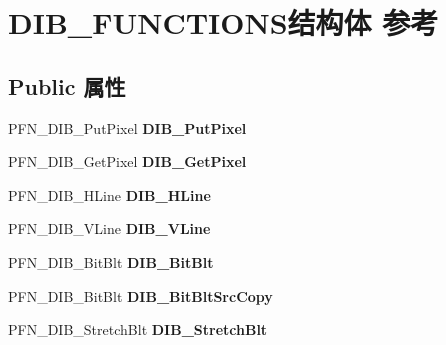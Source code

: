 \hypertarget{struct_d_i_b___f_u_n_c_t_i_o_n_s}{}\section{D\+I\+B\+\_\+\+F\+U\+N\+C\+T\+I\+O\+N\+S结构体 参考}
\label{struct_d_i_b___f_u_n_c_t_i_o_n_s}
\subsection*{Public 属性}
\begin{DoxyCompactItemize}
\item 
\mbox{\label{struct_d_i_b___f_u_n_c_t_i_o_n_s_a29746dbf1ef2da59c655a4b828825ba0}} 
P\+F\+N\+\_\+\+D\+I\+B\+\_\+\+Put\+Pixel {\bfseries D\+I\+B\+\_\+\+Put\+Pixel}
\item 
\mbox{\label{struct_d_i_b___f_u_n_c_t_i_o_n_s_ad50bc2347d760401c947f12371e8ccb9}} 
P\+F\+N\+\_\+\+D\+I\+B\+\_\+\+Get\+Pixel {\bfseries D\+I\+B\+\_\+\+Get\+Pixel}
\item 
\mbox{\label{struct_d_i_b___f_u_n_c_t_i_o_n_s_a386100e3b1fc7f46d1cf5d2816cde6d7}} 
P\+F\+N\+\_\+\+D\+I\+B\+\_\+\+H\+Line {\bfseries D\+I\+B\+\_\+\+H\+Line}
\item 
\mbox{\label{struct_d_i_b___f_u_n_c_t_i_o_n_s_ad0ead3e3548b94a20cd1407bfdcfbf7c}} 
P\+F\+N\+\_\+\+D\+I\+B\+\_\+\+V\+Line {\bfseries D\+I\+B\+\_\+\+V\+Line}
\item 
\mbox{\label{struct_d_i_b___f_u_n_c_t_i_o_n_s_a99b8810811ee025f9ad8b62586f349be}} 
P\+F\+N\+\_\+\+D\+I\+B\+\_\+\+Bit\+Blt {\bfseries D\+I\+B\+\_\+\+Bit\+Blt}
\item 
\mbox{\label{struct_d_i_b___f_u_n_c_t_i_o_n_s_a21f6b59c9262ed811ec1f48586f30c1a}} 
P\+F\+N\+\_\+\+D\+I\+B\+\_\+\+Bit\+Blt {\bfseries D\+I\+B\+\_\+\+Bit\+Blt\+Src\+Copy}
\item 
\mbox{\label{struct_d_i_b___f_u_n_c_t_i_o_n_s_aefd03cfeac978c48db770c3ed6e72594}} 
P\+F\+N\+\_\+\+D\+I\+B\+\_\+\+Stretch\+Blt {\bfseries D\+I\+B\+\_\+\+Stretch\+Blt}

\end{DoxyCompactItemize}
